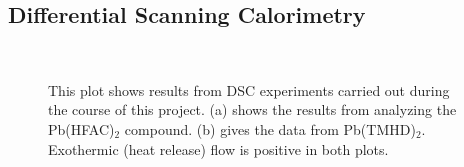 \clearpage


\subsection{Differential Scanning Calorimetry}
\label{sup:Thermal-Results-DSC}

\begin{figure}[htbp]
   \centering
    \\
   \caption[Results of DSC Experiments]%
   		{This plot shows results from DSC experiments carried out during the course of %
		this project. (a) shows the results from analyzing the Pb(HFAC)$_{2}$ compound. (b) gives %
		the data from Pb(TMHD)$_{2}$. Exothermic (heat release) flow is positive in both plots. }
   \label{fig:DSC-Data}
\end{figure}

